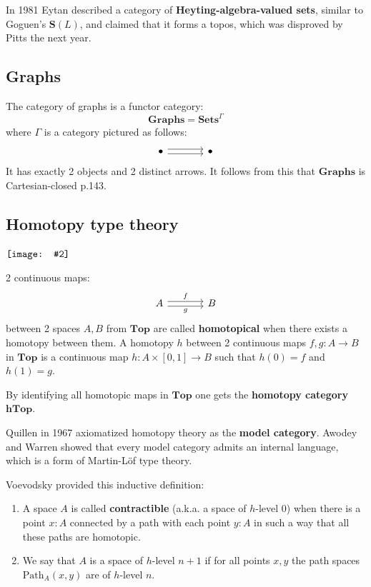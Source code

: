 \documentclass[12pt, orivec]{article}
\newcommand{\book}[1]{$\NewSym[0.4]{../book-icon.png} \quad$ \parbox{0.9\textwidth}{\footnotesize #1}}
\newcommand*\NewSym[2][0.5]{\vcenter{\hbox{\texttt{[image: \#2]}}}}
\begin{document}
In 1981 Eytan described a category of \textbf{Heyting-algebra-valued sets}, similar to Goguen's $\mathbf{S}(L)$, and claimed that it forms a topos, which was disproved by Pitts the next year.


\subsection{Graphs}

The category of graphs is a functor category:
\begin{equation}
\mathbf{Graphs} = \mathbf{Sets}^\Gamma
\end{equation}
where $\Gamma$ is a category pictured as follows:
\begin{equation}
\begin{tikzcd}[column sep = large]
\bullet \arrow[r, shift left] \arrow[r, shift right] & \bullet
\end{tikzcd}
\end{equation}
It has exactly 2 objects and 2 distinct arrows.  It follows from this that $\mathbf{Graphs}$ is Cartesian-closed \parencite{Awodey2006} p.143.

\subsection{Homotopy type theory}

\book{ \parencite{Rodin2014} }

2 continuous maps:
\begin{equation}
\begin{tikzcd}[column sep = large]
A \arrow[r, shift left, "f"] \arrow[r, shift right, swap, "g"] & B
\end{tikzcd}
\end{equation}
between 2 spaces $A, B$ from $\mathbf{Top}$ are called \textbf{homotopical} when there exists a homotopy between them.  A homotopy $h$ between 2 continuous maps $f,g: A \rightarrow B$ in $\mathbf{Top}$ is a continuous map $h: A \times [0,1] \rightarrow B$ such that $h(0) = f$ and $h(1) = g$.

By identifying all homotopic maps in $\mathbf{Top}$ one gets the \textbf{homotopy category} $\mathbf{hTop}$.

Quillen in 1967 axiomatized homotopy theory as the \textbf{model category}.  Awodey and Warren showed that every model category admits an internal language, which is a form of Martin-L\"{o}f type theory.

Voevodsky provided this inductive definition:
\begin{enumerate}
\item A space $A$ is called \textbf{contractible} (a.k.a. a space of $h$-level 0) when there is a point $x: A$ connected by a path with each point $y: A$ in such a way that all these paths are homotopic.

\item We say that $A$ is a space of $h$-level $n + 1$ if for all points $x, y$ the path spaces $\mathrm{Path}_A (x,y)$ are of $h$-level $n$.
\end{enumerate}
\end{document}

